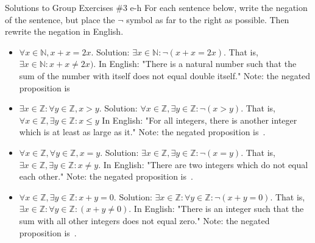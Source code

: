 \documentclass[10pt]{beamer}
\begin{document}
\begin{frame}{Solutions to Group Exercises \#3 e-h}
\small 
For each sentence below, write the negation of the sentence, but place the $\lnot$ symbol as far to the right as possible. Then rewrite the negation in English. 
    \begin{itemize}
     \item[e.] $\forall x \in \mathbb{N}, x+x=2x.$  \alert{Solution: $\exists x \in \mathbb{N}: \lnot (x+x=2x)$.  That is, $\exists x \in \mathbb{N}: x+x \neq 2x)$.  In English: "There is a natural number such that the sum of the number with itself does not equal double itself."  Note: the negated proposition is}\,  
        \item[f.] $\exists x \in \mathbb{Z}: \forall y \in \mathbb{Z}, x>y.$  \alert{Solution: $\forall x \in \mathbb{Z}, \exists y \in \mathbb{Z} : \lnot (x>y)$.   That is, $\forall x \in \mathbb{Z}, \exists y \in \mathbb{Z} : x\leq y$ In English: "For all integers, there is another integer which is at least as large as it."  Note: the negated proposition is}\, .  
        \item[g.]  $\forall x \in \mathbb{Z}, \forall y \in \mathbb{Z}, x=y.$  \alert{Solution: $\exists x \in \mathbb{Z}, \exists y \in \mathbb{Z} : \lnot (x=y)$.   That is, $\exists x \in \mathbb{Z}, \exists y \in \mathbb{Z} : x\neq y$. In English: "There are two integers which do not equal each other."  Note: the negated proposition is}\, .  
        \item[h.] $\forall x \in \mathbb{Z}, \exists y \in \mathbb{Z}: x+y=0.$  \alert{Solution: $\exists x \in \mathbb{Z}: \forall y \in \mathbb{Z} : \lnot (x+y=0)$.   That is, $\exists x \in \mathbb{Z}: \forall y \in \mathbb{Z} : (x+y \neq 0)$.  In English: "There is an integer such that the sum with all other integers does not equal zero."  Note: the negated proposition is}\, .  

        \end{itemize}
\end{frame}
\end{document}

